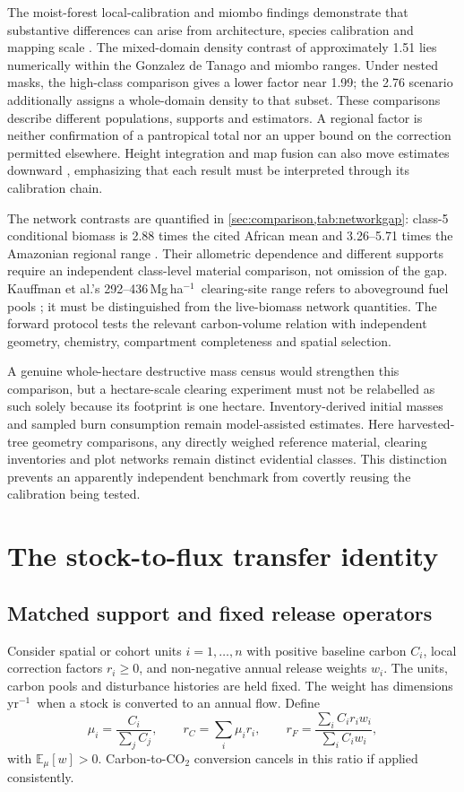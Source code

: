 \documentclass[11pt,a4paper]{article}
\newcommand{\COtwo}{\ensuremath{\mathrm{CO}_2}}
\newcommand{\E}{\mathbb{E}}
\theoremstyle{remark}
\begin{document}
The moist-forest local-calibration and miombo findings demonstrate that substantive differences can arise from architecture, species calibration and mapping scale \citep{Huertas2025,Demol2024}. The mixed-domain density contrast of approximately 1.51 lies numerically within the Gonzalez de Tanago and miombo ranges. Under nested masks, the high-class comparison gives a lower factor near 1.99; the 2.76 scenario additionally assigns a whole-domain density to that subset. These comparisons describe different populations, supports and estimators. A regional factor is neither confirmation of a pantropical total nor an upper bound on the correction permitted elsewhere. Height integration and map fusion can also move estimates downward \citep{Feldpausch2012,Avitabile2016}, emphasizing that each result must be interpreted through its calibration chain.

The network contrasts are quantified in \cref{sec:comparison,tab:networkgap}: class-5 conditional biomass is 2.88 times the cited African mean and 3.26--5.71 times the Amazonian regional range \citep{Lewis2013,Malhi2006}. Their allometric dependence and different supports require an independent class-level material comparison, not omission of the gap. Kauffman et al.'s 292--436\,Mg\,ha$^{-1}$\ clearing-site range refers to aboveground fuel pools \citep{Kauffman1995}; it must be distinguished from the live-biomass network quantities. The forward protocol tests the relevant carbon-volume relation with independent geometry, chemistry, compartment completeness and spatial selection.

A genuine whole-hectare destructive mass census would strengthen this comparison, but a hectare-scale clearing experiment must not be relabelled as such solely because its footprint is one hectare. Inventory-derived initial masses and sampled burn consumption remain model-assisted estimates. Here harvested-tree geometry comparisons, any directly weighed reference material, clearing inventories and plot networks remain distinct evidential classes. This distinction prevents an apparently independent benchmark from covertly reusing the calibration being tested.

\section{The stock-to-flux transfer identity}
\subsection{Matched support and fixed release operators}
Consider spatial or cohort units $i=1,\ldots,n$ with positive baseline carbon $C_i$, local correction factors $r_i\geq0$, and non-negative annual release weights $w_i$. The units, carbon pools and disturbance histories are held fixed. The weight has dimensions yr$^{-1}$\ when a stock is converted to an annual flow. Define
\begin{equation}
\mu_i=\frac{C_i}{\sum_j C_j},\qquad r_C=\sum_i\mu_i r_i,
\qquad r_F=\frac{\sum_i C_i r_i w_i}{\sum_i C_i w_i},
\label{eq:ratios}
\end{equation}
with $\E_\mu[w]>0$. Carbon-to-\COtwo{} conversion cancels in this ratio if applied consistently.
\end{document}
